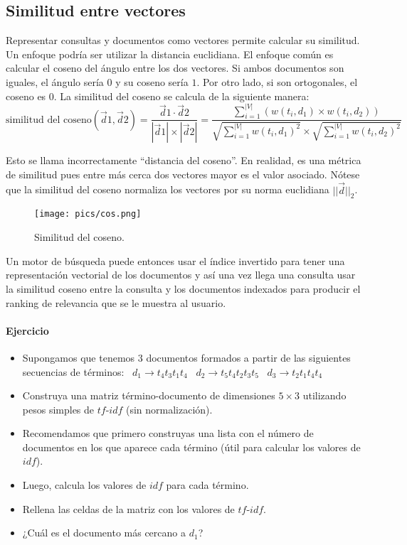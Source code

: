 \subsection{Similitud entre vectores}
Representar consultas y documentos como vectores permite calcular su similitud. Un enfoque podría ser utilizar la distancia euclidiana. El enfoque común es calcular el coseno del ángulo entre los dos vectores. Si ambos documentos son iguales, el ángulo sería $0$ y su coseno sería $1$. Por otro lado, si son ortogonales, el coseno es $0$. La similitud del coseno se calcula de la siguiente manera:
\begin{displaymath}
\text{similitud del coseno}(\vec{d}{1},\vec{d}{2})= \frac{\vec{d}{1}\cdot \vec{d}{2}}{|\vec{d}{1}|\times|\vec{d}{2}|} = \frac{\sum_{i=1}^{|V|}(w(t_{i},d_{1})\times w(t_{i},d_{2}))}{\sqrt{\sum_{i=1}^{|V|} w(t_{i},d_{1})^2}\times \sqrt{\sum_{i=1}^{|V|} w(t_{i},d_{2})^2}}
\end{displaymath}

Esto se llama incorrectamente ``distancia del coseno''. En realidad, es una métrica de similitud pues entre más cerca dos vectores mayor es el valor asociado. Nótese que la similitud del coseno normaliza los vectores por su norma euclidiana $||\vec{d}||_{2}$.

\begin{figure}[h!]
\centering
\texttt{[image: pics/cos.png]}
\caption{Similitud del coseno.}
\end{figure}

Un motor de búsqueda puede entonces usar el índice invertido para tener una representación vectorial de los documentos y así una vez llega una consulta usar la similitud coseno entre la consulta y los documentos indexados para producir el ranking de relevancia que se le muestra al usuario.

\paragraph{Ejercicio}
\begin{itemize}
\item Supongamos que tenemos $3$ documentos formados a partir de las siguientes secuencias de términos: \
$d_{1}\rightarrow t_{4}t_{3}t_{1}t_{4}$ \
$d_{2}\rightarrow t_{5}t_{4}t_{2}t_{3}t_{5}$ \
$d_{3}\rightarrow t_{2}t_{1}t_{4}t_{4}$ \
\item Construya una matriz término-documento de dimensiones $5\times3$ utilizando pesos simples de $tf$-$idf$ (sin normalización).
\item Recomendamos que primero construyas una lista con el número de documentos en los que aparece cada término (útil para calcular los valores de $idf$).
\item Luego, calcula los valores de $idf$ para cada término.
\item Rellena las celdas de la matriz con los valores de $tf$-$idf$.
\item ¿Cuál es el documento más cercano a $d_{1}$?
\end{itemize}

